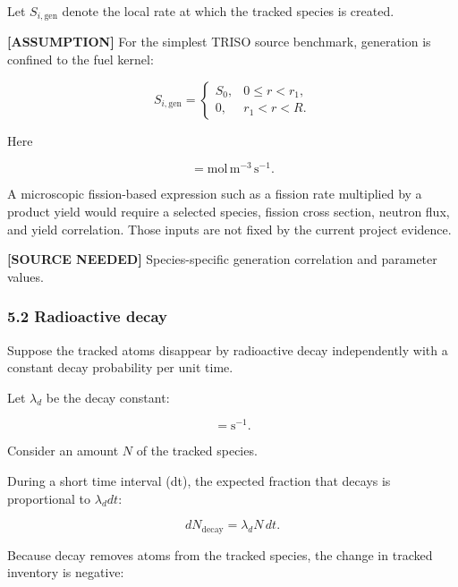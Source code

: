 \documentclass[11pt,a4paper]{article}
\begin{document}
Let $S_{i,\mathrm{gen}}$ denote the local rate at which the tracked species is created.

\textbf{[ASSUMPTION]} For the simplest TRISO source benchmark, generation is confined to the fuel kernel:

\begin{equation}
S_{i,\mathrm{gen}}=
\begin{cases}
S_0,&0\le r<r_1,\\
0,&r_1<r<R.
\end{cases}
\tag{TRISO-GOV-102}
\label{eq:triso-gov-102}
\end{equation}

Here

\begin{equation}
[S_0]=\mathrm{mol\,m^{-3}\,s^{-1}}.
\tag{TRISO-GOV-103}
\label{eq:triso-gov-103}
\end{equation}

A microscopic fission-based expression such as a fission rate multiplied by a product yield would require a selected species, fission cross section, neutron flux, and yield correlation. Those inputs are not fixed by the current project evidence.

\textbf{[SOURCE NEEDED]} Species-specific generation correlation and parameter values.

\subsubsection*{5.2 Radioactive decay}

Suppose the tracked atoms disappear by radioactive decay independently with a constant decay probability per unit time.

Let $\lambda_d$ be the decay constant:

\begin{equation}
[\lambda_d]=\mathrm{s^{-1}}.
\tag{TRISO-GOV-104}
\label{eq:triso-gov-104}
\end{equation}

Consider an amount $N$ of the tracked species.

During a short time interval (dt), the expected fraction that decays is proportional to $\lambda_d dt$:

\begin{equation}
dN_{\mathrm{decay}}=\lambda_d N\,dt.
\tag{TRISO-GOV-105}
\label{eq:triso-gov-105}
\end{equation}

Because decay removes atoms from the tracked species, the change in tracked inventory is negative:
\end{document}
